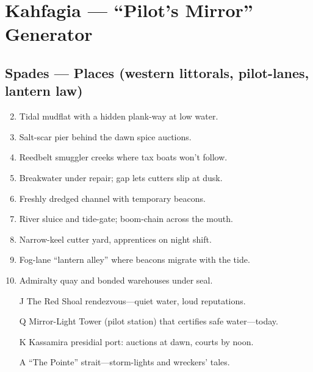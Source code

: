 \chapter{Kahfagia --- ``Pilot's Mirror'' Generator}

\section*{Spades --- Places (western littorals, pilot-lanes, lantern law)}
\begin{enumerate}
\setcounter{enumi}{1}
\item Tidal mudflat with a hidden plank-way at low water.
\item Salt-scar pier behind the dawn spice auctions.
\item Reedbelt smuggler creeks where tax boats won't follow.
\item Breakwater under repair; gap lets cutters slip at dusk.
\item Freshly dredged channel with temporary beacons.
\item River sluice and tide-gate; boom-chain across the mouth.
\item Narrow-keel cutter yard, apprentices on night shift.
\item Fog-lane ``lantern alley'' where beacons migrate with the tide.
\item Admiralty quay and bonded warehouses under seal.
\item[J] The Red Shoal rendezvous---quiet water, loud reputations.
\item[Q] Mirror-Light Tower (pilot station) that certifies safe water---today.
\item[K] Kassamira presidial port: auctions at dawn, courts by noon.
\item[A] ``The Pointe'' strait---storm-lights and wreckers' tales.
\end{enumerate}

